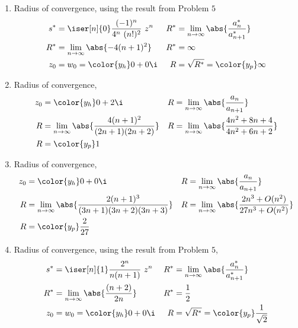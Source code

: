 \begin{enumerate}
    \item Radius of convergence, using the result from Problem $ 5 $
          \begin{align}
              s^* & = \iser[n]{0} \frac{(-1)^n}{4^n\ (n!)^2}\ z^n       &
              R^* & = \lim_{n \to \infty} \abs{\frac{a_n^*}{a_{n+1}^*}}   \\
              R^* & = \lim_{n \to \infty} \abs{-4(n+1)^2}               &
              R^* & = \infty                                              \\
              z_0 & = w_0 = \color{y_h} 0 + 0 \i                        &
              R   & = \sqrt{R^*} = \color{y_p} \infty
          \end{align}

    \item Radius of convergence,
          \begin{align}
              z_0 & = \color{y_h} 0 + 2\i                                           &
              R   & = \lim_{n \to \infty} \abs{\frac{a_n}{a_{n+1}}}                   \\
              R   & = \lim_{n \to \infty} \abs{\frac{4(n+1)^2}{(2n+1)(2n+2)}}       &
              R   & = \lim_{n \to \infty} \abs{\frac{4n^2 + 8n + 4}{4n^2 + 6n + 2}}   \\
              R   & = \color{y_p} 1
          \end{align}

    \item Radius of convergence,
          \begin{align}
              z_0 & = \color{y_h} 0 + 0\i                                            &
              R   & = \lim_{n \to \infty} \abs{\frac{a_n}{a_{n+1}}}                    \\
              R   & = \lim_{n \to \infty} \abs{\frac{2(n+1)^3}{(3n+1)(3n+2)(3n+3)}}  &
              R   & = \lim_{n \to \infty} \abs{\frac{2n^3 + O(n^2)}{27n^3 + O(n^2)}}   \\
              R   & = \color{y_p} \frac{2}{27}
          \end{align}

    \item Radius of convergence, using the result from Problem $ 5 $,
          \begin{align}
              s^* & = \iser[n]{1} \frac{2^n}{n(n+1)}\ z^n               &
              R^* & = \lim_{n \to \infty} \abs{\frac{a_n^*}{a_{n+1}^*}}   \\
              R^* & = \lim_{n \to \infty} \abs{\frac{(n+2)}{2n}}        &
              R^* & = \frac{1}{2}                                         \\
              z_0 & = w_0 = \color{y_h} 0 + 0 \i                        &
              R   & = \sqrt{R^*} = \color{y_p} \frac{1}{\sqrt{2}}
          \end{align}


\end{enumerate}
